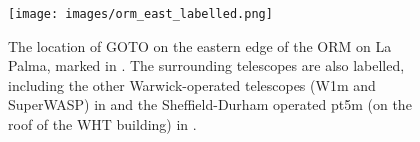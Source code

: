 \begin{colsection}
\begin{colsection}
\begin{figure}[p]
    \begin{center}
        \texttt{[image: images/orm\_east\_labelled.png]}
    \end{center}
    \caption[The location of GOTO on La Palma]{
        The location of GOTO on the eastern edge of the ORM on La Palma, marked in . The surrounding telescopes are also labelled, including the other Warwick-operated telescopes (W1m and SuperWASP) in  and the Sheffield-Durham operated pt5m (on the roof of the WHT building) in .
    }\label{fig:orm_east}
\end{figure}

\clearpage

\end{colsection}


\end{colsection}

